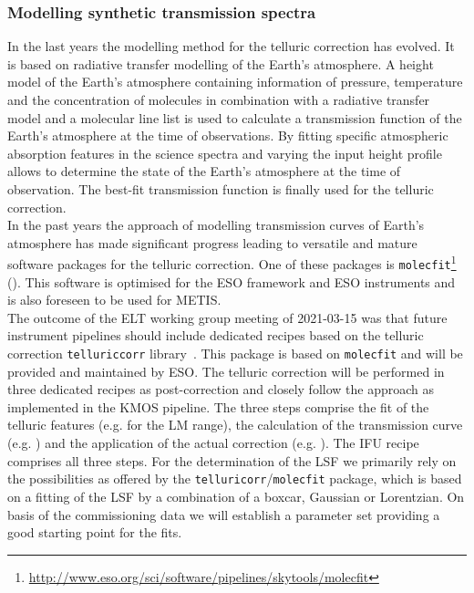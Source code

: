 \subsubsection{Modelling synthetic transmission spectra}
In the last years the modelling method for the telluric correction has evolved. It is based on radiative transfer modelling of the Earth's atmosphere. A height model of the Earth's atmosphere containing information of pressure, temperature and the concentration of molecules in combination with a radiative transfer model and a molecular line list is used to calculate a transmission function of the Earth's atmosphere at the time of observations. By fitting specific atmospheric absorption features in the science spectra and varying the input height profile allows to determine the state of the Earth's atmosphere at the time of observation. The best-fit transmission function is finally used for the telluric correction.\\
In the past years the approach of modelling transmission curves of Earth's atmosphere has made significant progress leading to versatile and mature software packages for the telluric correction. One of these packages is \texttt{molecfit}\footnote{\url{http://www.eso.org/sci/software/pipelines/skytools/molecfit}} (\cite{mf1, mf2, molecfit}). This software is optimised for the ESO framework and ESO instruments and is also foreseen to be used for \ac{METIS}.\\
The outcome of the \ac{ELT} working group meeting of 2021-03-15 was that future instrument pipelines should include dedicated recipes based on the telluric correction \texttt{telluriccorr} library~\cite{telluriccorr}. This package is based on \texttt{molecfit} and will be provided and maintained by \ac{ESO}. The telluric correction will be performed in three dedicated recipes as post-correction   and closely follow the approach as implemented in the \ac{KMOS} pipeline. The three steps comprise the fit of the telluric features (e.g.  for the LM range), the calculation of the transmission curve (e.g. ) and the application of the actual correction (e.g. ). The IFU recipe  comprises all three steps. For the determination of the \ac{LSF} we primarily rely on the possibilities as offered by the \texttt{telluricorr}/\texttt{molecfit} package, which is based on a fitting of the \ac{LSF} by a combination of a boxcar, Gaussian or Lorentzian. On basis of the commissioning data we will establish a parameter set providing a good starting point for the fits.\\
